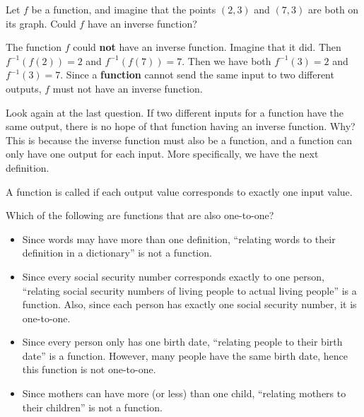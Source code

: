 \documentclass{ximera}
\begin{document}
\begin{question}
  Let $f$ be a function, and imagine that the points $(2,3)$ and
  $(7,3)$ are both on its graph.  Could $f$ have an inverse function?
  \begin{multipleChoice}
  \end{multipleChoice}
  \begin{feedback}
    The function $f$ could \textbf{not} have an inverse function.
    Imagine that it did.  Then $f^{-1}(f(2)) = 2$ and $f^{-1}(f(7)) =
    7$.  Then we have both $f^{-1}(3) = 2$ and $f^{-1}(3) = 7$.  Since
    a \textbf{function} cannot send the same input to two different
    outputs, $f$ must not have an inverse function.
  \end{feedback}
\end{question}


Look again at the last question.  If two different inputs for a
function have the same output, there is no hope of that function
having an inverse function.  Why?  This is because the inverse
function must also be a function, and a function can only have one
output for each input.  More specifically, we have the next
definition.

\begin{definition}
A function is called  if each output value corresponds
to exactly one input value.
\end{definition}

\begin{question}
  Which of the following are functions that are also one-to-one?
  \begin{selectAll}
  \end{selectAll}
  \begin{feedback}\hfil
    \begin{itemize}
    \item Since words may have more than one definition, ``relating
      words to their definition in a dictionary'' is not a function.
    \item Since every social security number corresponds exactly to
      one person, ``relating social security numbers of living people
      to actual living people'' is a function. Also, since each person
      has exactly one social security number, it is one-to-one.
    \item Since every person only has one birth date, ``relating
      people to their birth date'' is a function. However, many people
      have the same birth date, hence this function is not one-to-one.
      \item Since mothers can have more (or less) than one child,
        ``relating mothers to their children'' is not a function.
    \end{itemize}
  \end{feedback}
\end{question}
\end{document}

